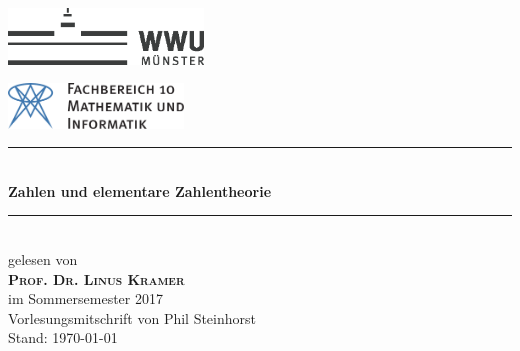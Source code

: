 \begin{titlepage}
	\newcommand{\HRule}{\rule{\linewidth}{0.8mm}} %

	\center %
 
	\begin{minipage}{0.4\textwidth}
	\begin{flushleft}
	\includegraphics[height=1.5cm,keepaspectratio]{../!config/Bilder/wwulogo17.eps}\\[1cm]
	\end{flushleft}
	\end{minipage}
	\hfill
	\begin{minipage}{0.4\textwidth}
	\begin{flushright}
	\vspace*{0.3cm}
	\includegraphics[height=1.2cm,keepaspectratio]{../!config/Bilder/fb10logo.pdf} \
	\end{flushright}
	\end{minipage}

	\vspace{2cm}
	
	\HRule \\[0.8cm]
	{ \huge \sffamily\bfseries Zahlen und elementare Zahlentheorie}\\[0.4cm] %
	\HRule \\[1cm]
 
	{\LARGE gelesen von} \\[.7cm]
	\textsc{\LARGE \textbf{Prof. Dr. Linus Kramer}}\\[.7cm]
	{\LARGE im Sommersemester 2017}\\[2cm]


	\vfill
	{\Large Vorlesungsmitschrift von Phil Steinhorst} \\[.5cm]
	{\large Stand: \today}
	
\end{titlepage}
\cleardoubleemptypage